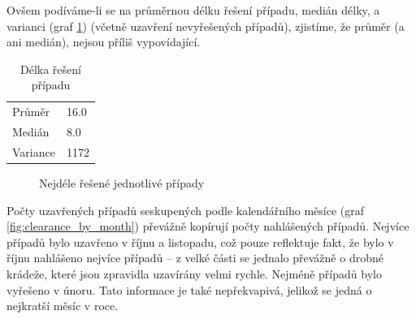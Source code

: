 \documentclass{article}
\begin{document}
Ovšem podíváme-li se na průměrnou délku řešení případu, medián délky, a varianci (graf
\ref{tab:avg_clearance}) (včetně uzavření nevyřešených případů), zjistíme, že průměr (a ani medián),
nejsou příliš vypovídající.

\begin{table}
  \centering
  \caption{Délka řešení případu}
  \label{tab:avg_clearance}
  \begin{tabular}{ |l|l| }
  \hline
      Průměr & 16.0 \\
      Medián & 8.0 \\
      Variance & 1172 \\
  \hline
  \end{tabular}
\end{table}

\begin{figure}
  \centering
  \caption{Nejdéle řešené jednotlivé případy}
  \label{fig:top_clearance_times}
\end{figure}

Počty uzavřených případů seskupených podle kalendářního měsíce (graf \ref{fig:clearance_by_month}) převážně
kopírují počty nahlášených případů. Nejvíce případů bylo uzavřeno v říjnu a listopadu, což pouze reflektuje
fakt, že bylo v říjnu nahlášeno nejvíce případů -- z velké části se jednalo převážně o drobné krádeže,
které jsou zpravidla uzavírány velmi rychle. Nejméně případů bylo vyřešeno v únoru. Tato informace
je také nepřekvapivá, jelikož se jedná o nejkratší měsíc v roce.
\end{document}

